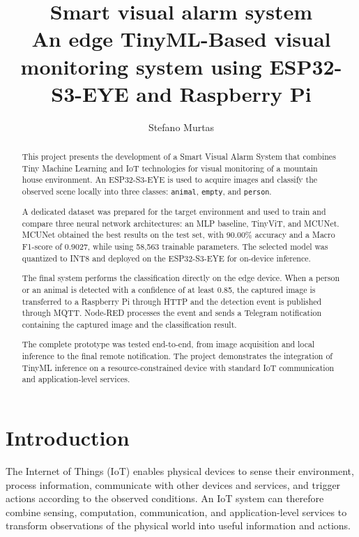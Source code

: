 \documentclass{article}
\title{Smart visual alarm system \\
\large An edge TinyML-Based visual monitoring system using ESP32-S3-EYE and Raspberry Pi}
\author{Stefano Murtas}
\begin{document}
\maketitle

\begin{abstract}

This project presents the development of a Smart Visual Alarm System that
combines Tiny Machine Learning and IoT technologies for visual monitoring
of a mountain house environment. An ESP32-S3-EYE is used to acquire images
and classify the observed scene locally into three classes:
\texttt{animal}, \texttt{empty}, and \texttt{person}.

A dedicated dataset was prepared for the target environment and used to
train and compare three neural network architectures: an MLP baseline,
TinyViT, and MCUNet. MCUNet obtained the best results on the test set, with
90.00\% accuracy and a Macro F1-score of 0.9027, while using 58,563
trainable parameters. The selected model was quantized to INT8 and deployed
on the ESP32-S3-EYE for on-device inference.

The final system performs the classification directly on the edge device.
When a person or an animal is detected with a confidence of at least 0.85,
the captured image is transferred to a Raspberry Pi through HTTP and the
detection event is published through MQTT. Node-RED processes the event and
sends a Telegram notification containing the captured image and the
classification result.

The complete prototype was tested end-to-end, from image acquisition and
local inference to the final remote notification. The project demonstrates
the integration of TinyML inference on a resource-constrained device with
standard IoT communication and application-level services.

\end{abstract}

\section{Introduction}

The Internet of Things (IoT) enables physical devices to sense their
environment, process information, communicate with other devices and
services, and trigger actions according to the observed conditions.
An IoT system can therefore combine sensing, computation, communication,
and application-level services to transform observations of the physical
world into useful information and actions.
\end{document}
